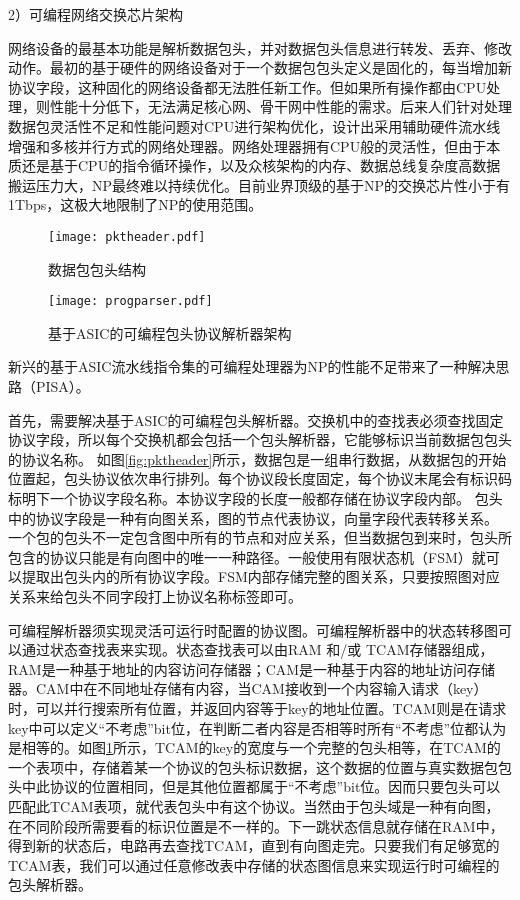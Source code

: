 2）可编程网络交换芯片架构

网络设备的最基本功能是解析数据包头，并对数据包头信息进行转发、丢弃、修改动作。最初的基于硬件的网络设备对于一个数据包包头定义是固化的，每当增加新协议字段，这种固化的网络设备都无法胜任新工作。但如果所有操作都由CPU处理，则性能十分低下，无法满足核心网、骨干网中性能的需求。后来人们针对处理数据包灵活性不足和性能问题对CPU进行架构优化，设计出采用辅助硬件流水线增强和多核并行方式的网络处理器。网络处理器拥有CPU般的灵活性，但由于本质还是基于CPU的指令循环操作，以及众核架构的内存、数据总线复杂度高数据搬运压力大，NP最终难以持续优化。目前业界顶级的基于NP的交换芯片性小于有1Tbps，这极大地限制了NP的使用范围。


\begin{figure}[htbp]
	\centering
	\begin{minipage}[t]{0.48\textwidth}
		\centering
		\texttt{[image: pktheader.pdf]}
		\caption{数据包包头结构} \label{fig:pktheader}
	\end{minipage}
	\begin{minipage}[t]{0.48\textwidth}
		\centering
		\texttt{[image: progparser.pdf]}
		\caption{基于ASIC的可编程包头协议解析器架构} \label{fig:progparser}
	\end{minipage}
\end{figure}

新兴的基于ASIC流水线指令集的可编程处理器为NP的性能不足带来了一种解决思路（PISA）。

首先，需要解决基于ASIC的可编程包头解析器。交换机中的查找表必须查找固定协议字段，所以每个交换机都会包括一个包头解析器，它能够标识当前数据包包头的协议名称。
如图\ref{fig:pktheader}所示，数据包是一组串行数据，从数据包的开始位置起，包头协议依次串行排列。每个协议段长度固定，每个协议末尾会有标识码标明下一个协议字段名称。本协议字段的长度一般都存储在协议字段内部。
包头中的协议字段是一种有向图关系，图的节点代表协议，向量字段代表转移关系。
一个包的包头不一定包含图中所有的节点和对应关系，但当数据包到来时，包头所包含的协议只能是有向图中的唯一一种路径。一般使用有限状态机（FSM）就可以提取出包头内的所有协议字段。FSM内部存储完整的图关系，只要按照图对应关系来给包头不同字段打上协议名称标签即可。



可编程解析器须实现灵活可运行时配置的协议图。可编程解析器中的状态转移图可以通过状态查找表来实现。状态查找表可以由RAM 和/或 TCAM存储器组成，RAM是一种基于地址的内容访问存储器；CAM是一种基于内容的地址访问存储器。CAM中在不同地址存储有内容，当CAM接收到一个内容输入请求（key）时，可以并行搜索所有位置，并返回内容等于key的地址位置。TCAM则是在请求key中可以定义“不考虑”bit位，在判断二者内容是否相等时所有“不考虑”位都认为是相等的。如图\ref{fig:progparser}所示，TCAM的key的宽度与一个完整的包头相等，在TCAM的一个表项中，存储着某一个协议的包头标识数据，这个数据的位置与真实数据包包头中此协议的位置相同，但是其他位置都属于“不考虑”bit位。因而只要包头可以匹配此TCAM表项，就代表包头中有这个协议。当然由于包头域是一种有向图，在不同阶段所需要看的标识位置是不一样的。下一跳状态信息就存储在RAM中，得到新的状态后，电路再去查找TCAM，直到有向图走完。只要我们有足够宽的TCAM表，我们可以通过任意修改表中存储的状态图信息来实现运行时可编程的包头解析器。

